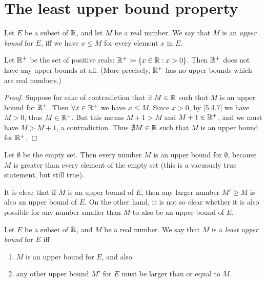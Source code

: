 \section{The least upper bound property}\label{sec:5.5}

\begin{defn}\label{5.5.1}
  Let \(E\) be a subset of \(\mathbb{R}\), and let \(M\) be a real number.
  We say that \(M\) is an \emph{upper bound} for \(E\), iff we have \(x \leq M\) for every element \(x\) in \(E\).
\end{defn}

\setcounter{thm}{2}
\begin{eg}\label{5.5.3}
  Let \(\mathbb{R}^+\) be the set of positive reals: \(\mathbb{R}^+ \coloneqq \{x \in \mathbb{R} : x > 0\}\).
  Then \(\mathbb{R}^+\) does not have any upper bounds at all.
  (More precisely, \(\mathbb{R}^+\) has no upper bounds which are real numbers.)
\end{eg}

\begin{proof}
  Suppose for sake of contradiction that \(\exists\ M \in \mathbb{R}\) such that \(M\) is an upper bound for \(\mathbb{R}^+\).
  Then \(\forall x \in \mathbb{R}^+\) we have \(x \leq M\).
  Since \(x > 0\), by \cref{5.4.7} we have \(M > 0\), thus \(M \in \mathbb{R}^+\).
  But this means \(M + 1 > M\) and \(M + 1 \in \mathbb{R}^+\), and we must have \(M > M + 1\), a contradiction.
  Thus \(\nexists M \in \mathbb{R}\) such that \(M\) is an upper bound for \(\mathbb{R}^+\).
\end{proof}

\begin{eg}\label{5.5.4}
  Let \(\emptyset\) be the empty set.
  Then every number \(M\) is an upper bound for \(\emptyset\), because \(M\) is greater than every element of the empty set
  (this is a vacuously true statement, but still true).
\end{eg}

\begin{note}
  It is clear that if \(M\) is an upper bound of \(E\), then any larger number \(M' \geq M\) is also an upper bound of \(E\).
  On the other hand, it is not so clear whether it is also possible for any number smaller than \(M\) to also be an upper bound of \(E\).
\end{note}

\begin{defn}\label{5.5.5}
  Let \(E\) be a subset of \(\mathbb{R}\), and \(M\) be a real number.
  We say that \(M\) is a \emph{least upper bound} for \(E\) iff
  \begin{enumerate}
    \item \(M\) is an upper bound for \(E\), and also
    \item any other upper bound \(M'\) for \(E\) must be larger than or equal to \(M\).
  \end{enumerate}
\end{defn}

